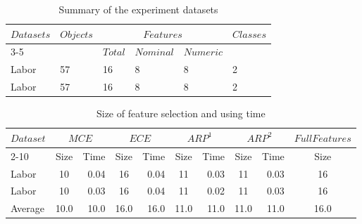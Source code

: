 \documentclass[final,5p,times]{elsarticle}
\begin{document}
\begin{table*}[htbp]
\centering
\caption{Summary of the experiment datasets}
\label{tab datasets des}
	\begin{tabular}{llllll}
	\toprule
	\multirow{3}{*}{\centering $Datasets$} &
 	\multirow{3}{*}{\centering $Objects$} &
 	\multicolumn{3}{c}{$Features$} & 
	\multirow{3}{*}{\centering $Classes$}\\
	\cmidrule{3-5}
	&&$Total$&$Nominal$&$Numeric$\\
	\midrule
	Labor	&	57	&	16	&	8	&	8	&	2	\\
	Labor	&	57	&	16	&	8	&	8	&	2	\\
	\bottomrule
	\end{tabular}
\end{table*}
\begin{table*}[htbp]
\centering
\caption{Size of feature selection and using time}
\label{tab size time}
	\begin{tabular}{lcrcrcrcrc}
	\toprule
	\multirow{3}{*}{\centering $Dataset$}&
	\multicolumn{2}{c}{$MCE$} &
	\multicolumn{2}{c}{$ECE$} &
	\multicolumn{2}{c}{$ARP^1$} &
	\multicolumn{2}{c}{$ARP^2$} &
	\multicolumn{1}{c}{$FullFeatures$}\\
	\cmidrule{2-10}&
	Size&Time&
	Size&Time&
	Size&Time&
	Size&Time&
	Size\\
	\midrule
	Labor	&	10	&	0.04	&	16	&	0.04	&	11	&	0.03	&	11	&	0.03	&	16\\
	Labor	&	10	&	0.03	&	16	&	0.04	&	11	&	0.02	&	11	&	0.03	&	16\\
	\midrule
	Average	&	10.0	&	10.0	&	16.0	&	16.0	&	11.0	&	11.0	&	11.0	&	11.0	&	16.0\\
	\bottomrule
	\end{tabular}
\end{table*}
\begin{table}[htbp]
\centering
\caption{Accuracy of  algorithms with NaiveBayes classifiers}
\label{tab accresults svm}
%
\end{table}
\end{document}
